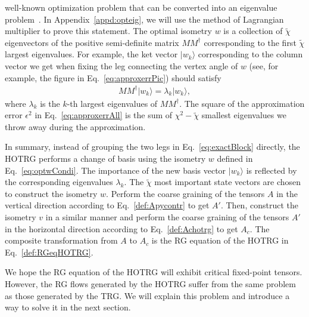 \documentclass[aps,prb,reprint,superscriptaddress,floatfix]{revtex4-2}
\newcommand{\ket}[1]{|#1\rangle} \newcommand{\bra}[1]{\langle#1|}
\begin{document}
well-known optimization problem that can be converted into an eigenvalue
problem~\cite{ghojogh2019eigenvalue}. In Appendix~\ref{appd:opteig}, we
will use the method of Lagrangian multiplier to prove this statement.
The optimal isometry $w$ is a collection of $\tilde{\chi}$ eigenvectors
of the positive semi-definite matrix $M M^{\dagger}$ corresponding to
the first $\tilde{\chi}$ largest eigenvalues. For example, the ket
vector $\ket{w_k}$ corresponding to the column vector we get when fixing
the leg connecting the vertex angle of $w$ (see, for example, the figure
in Eq.~\eqref{eq:approxerrPic}) should satisfy 
%
\begin{align}\label{eq:optwCondi} M M^{\dagger}\ket{w_k} = \lambda_k
\ket{w_k},     \end{align}
%
where $\lambda_k$ is the $k$-th largest eigenvalues of $M M^{\dagger}$.
The square of the approximation error $\epsilon^2$ in
Eq.~\eqref{eq:approxerrAll} is the sum of $\chi^2 - \tilde{\chi}$
smallest eigenvalues we throw away during the approximation.
%

In summary, instead of grouping the two legs in
Eq.~\eqref{eq:exactBlock} directly, the HOTRG performs a change of basis
using the isometry $w$ defined in Eq.~\eqref{eq:optwCondi}. The
importance of the new basis vector $\ket{w_k}$ is reflected by the
corresponding eigenvalues $\lambda_k$.  The $\tilde{\chi}$ most
important state vectors are chosen to construct the isometry $w$.
Perform the coarse graining of the tensors $A$ in the vertical direction
according to Eq.~\eqref{def:Apycontr} to get $A'$. Then, construct the
isometry $v$ in a similar manner and perform the coarse graining of the
tensors $A'$ in the horizontal direction according to
Eq.~\eqref{def:Achotrg} to get $A_c$. The composite transformation from
$A$ to $A_c$ is the RG equation of the HOTRG in
Eq.~\eqref{def:RGeqHOTRG}.
%

We hope the RG equation of the HOTRG will exhibit critical fixed-point
tensors. However, the RG flows generated by the HOTRG suffer from the
same problem as those generated by the TRG. We will explain this problem
and introduce a way to solve it in the next section.
\end{document}
